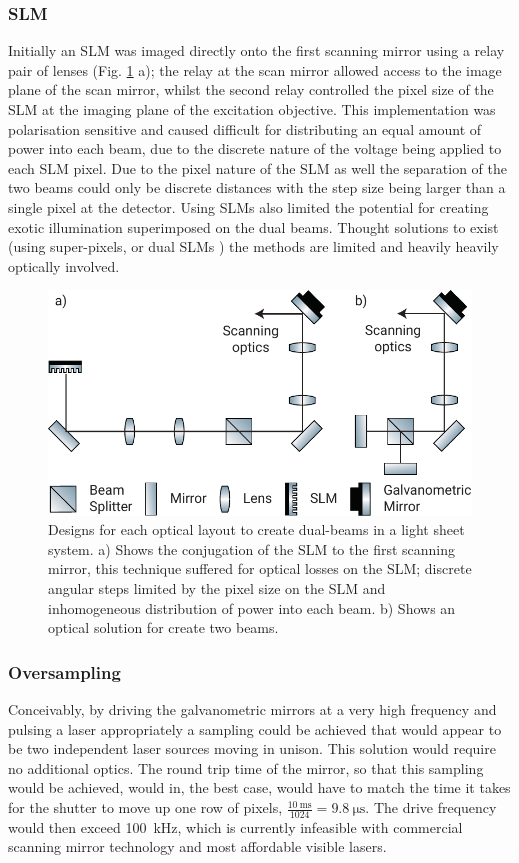 \subsubsection{SLM}
Initially an SLM was imaged directly onto the first scanning mirror using a relay pair of lenses (Fig. \ref{fig:dual_beam_layouts} a); the relay at the scan mirror allowed access to the image plane of the scan mirror, whilst the second relay controlled the pixel size of the SLM at the imaging plane of the excitation objective.
This implementation was polarisation sensitive and caused difficult for distributing an equal amount of power into each beam, due to the discrete nature of the voltage being applied to each SLM pixel.
Due to the pixel nature of the SLM as well the separation of the two beams could only be discrete distances with the step size being larger than a single pixel at the detector.
Using SLMs also limited the potential for creating exotic illumination superimposed on the dual beams.
Thought solutions to exist (using super-pixels\cite{}, or dual SLMs \cite{}) the methods are limited and heavily heavily optically involved.

\begin{figure}
  \centering
  \includegraphics{dual_beam_layouts}
  \caption{Designs for each optical layout to create dual-beams in a light sheet system.
  a) Shows the conjugation of the SLM to the first scanning mirror, this technique suffered for optical losses on the SLM; discrete angular steps limited by the pixel size on the SLM and inhomogeneous distribution of power into each beam.
  b) Shows an optical solution for create two beams.
  }
  \label{fig:dual_beam_layouts}
\end{figure}

\subsubsection{Oversampling}
Conceivably, by driving the galvanometric mirrors at a very high frequency and pulsing a laser appropriately a sampling could be achieved that would appear to be two independent laser sources moving in unison.
This solution would require no additional optics.
The round trip time of the mirror, so that this sampling would be achieved, would in, the best case, would have to match the time it takes for the shutter to move up one row of pixels, $\frac{\SI{10}{\milli\second}}{1024}=\SI{9.8}{\micro\second}$.
The drive frequency would then exceed \SI{100}{\kilo\hertz}, which is currently infeasible with commercial scanning mirror technology and most affordable visible lasers.

